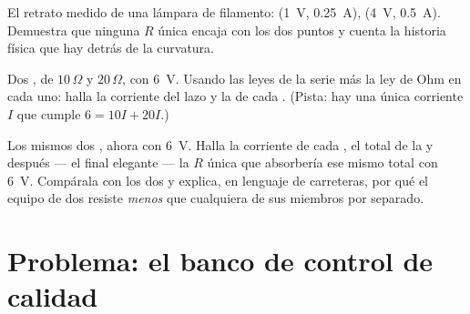 \begin{exercise}[$\star\star$]\label{exo:g8:ohms-law:10}
El retrato medido de una lámpara de filamento: (\qty{1}{V},
\qty{0.25}{A}), (\qty{4}{V}, \qty{0.5}{A}). Demuestra que ninguna $R$
única encaja con los dos puntos y cuenta la historia física que hay
detrás de la curvatura.
\end{exercise}

\begin{exercise}[$\star\star$]\label{exo:g8:ohms-law:11}
Dos  , de $10\,\Omega$ y
$20\,\Omega$, con \qty{6}{V}. Usando las leyes de la serie más la ley
de Ohm en cada uno: halla la corriente del lazo y la
 de cada . (Pista: hay una única
corriente $I$ que cumple $6 = 10 I + 20 I$.)
\end{exercise}

\begin{exercise}[$\star\star\star$]\label{exo:g8:ohms-law:12}
Los mismos dos , ahora  con
\qty{6}{V}. Halla la corriente de cada , el total de la
 y después --- el final elegante --- la
 $R$ única que absorbería ese mismo total con
\qty{6}{V}. Compárala con los dos  y explica, en
lenguaje de carreteras, por qué el equipo de dos resiste \emph{menos}
que cualquiera de sus miembros por separado.
\end{exercise}

\section{Problema: el banco de control de calidad}

